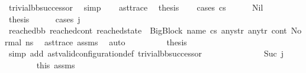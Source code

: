 \begin{isabellebody}
\ trivial{\isacharunderscore}{\kern0pt}bb{\isacharunderscore}{\kern0pt}successor\ \isamarkupfalse%
\ simp\isanewline
\ \ \isamarkupfalse%
\ ast{\isacharunderscore}{\kern0pt}trace\ \isamarkupfalse%
\ {\isacharquery}{\kern0pt}thesis\isanewline
\ \ \isamarkupfalse%
\ {\isacharparenleft}{\kern0pt}cases\ cs{}{\isacharparenright}{\kern0pt}\isanewline
\ \ \ \ \isamarkupfalse%
\ Nil\isanewline
\ \ \ \ \isamarkupfalse%
\ {\isacharquery}{\kern0pt}thesis\isanewline
\ \ \ \ \isamarkupfalse%
\ {\isacharparenleft}{\kern0pt}cases\ j{\isacharparenright}{\kern0pt}\isanewline
\ \ \ \ \ \ \isamarkupfalse%
\ {}\isanewline
\ \ \ \ \ \ \isamarkupfalse%
\ {\isachardoublequoteopen}{\isacharparenleft}{\kern0pt}reached{\isacharunderscore}{\kern0pt}bb{\isacharcomma}{\kern0pt}\ reached{\isacharunderscore}{\kern0pt}cont{\isacharcomma}{\kern0pt}\ reached{\isacharunderscore}{\kern0pt}state{\isacharparenright}{\kern0pt}\ {\isacharequal}{\kern0pt}\ {\isacharparenleft}{\kern0pt}{\isacharparenleft}{\kern0pt}BigBlock\ name\ cs{}\ any{\isacharunderscore}{\kern0pt}str\ any{\isacharunderscore}{\kern0pt}tr{\isacharparenright}{\kern0pt}{\isacharcomma}{\kern0pt}\ cont{}{\isacharcomma}{\kern0pt}\ {\isacharparenleft}{\kern0pt}Normal\ ns{}{\isacharparenright}{\kern0pt}{\isacharparenright}{\kern0pt}{\isachardoublequoteclose}\ \isamarkupfalse%
\ ast{\isacharunderscore}{\kern0pt}trace\ assms{\isacharparenleft}{\kern0pt}{}{\isacharparenright}{\kern0pt}\ \isamarkupfalse%
\ auto\isanewline
\ \ \ \ \ \ \isamarkupfalse%
\ \isamarkupfalse%
\ {\isacharquery}{\kern0pt}thesis\ \isamarkupfalse%
\ {\isacharparenleft}{\kern0pt}simp\ add{\isacharcolon}{\kern0pt}\ ast{\isacharunderscore}{\kern0pt}valid{\isacharunderscore}{\kern0pt}configuration{\isacharunderscore}{\kern0pt}def\ trivial{\isacharunderscore}{\kern0pt}bb{\isacharunderscore}{\kern0pt}successor{\isacharparenright}{\kern0pt}\ \isanewline
\ \ \ \ \isamarkupfalse%
\isanewline
\ \ \ \ \ \ \isamarkupfalse%
\ {}{\isacharcolon}{\kern0pt}\ {\isacharparenleft}{\kern0pt}Suc\ j{\isacharprime}{\kern0pt}{\isacharparenright}{\kern0pt}\isanewline
\ \ \ \ \ \ \isamarkupfalse%
\ this\ assms{\isacharparenleft}{\kern0pt}{}{\isacharparenright}{\kern0pt}\ \isamarkupfalse%

\end{isabellebody}
